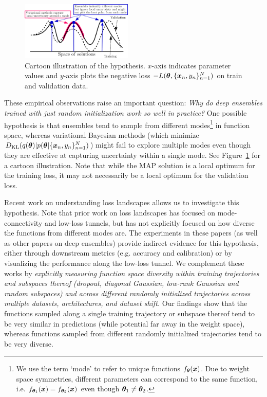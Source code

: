 \documentclass{article}
\newcommand{\data}{\{\vx_n, y_n\}_{n=1}^N}
\begin{document}
\begin{figure}
%
\vspace{-1em}
    \centering%
      \includegraphics[width=0.475\textwidth]{figures/big_idea_with_val.png}
\vspace{-0.5em}
    \caption{Cartoon illustration of the hypothesis. $x$-axis indicates parameter values and $y$-axis plots the negative loss $-L(\vtheta, \data)$ %
    on train and validation data. %
    }
    \vspace{-0.5em}
    \label{fig:ensemble-vs-bayes}%
%
%
\end{figure}
These empirical observations raise an important question:  %
   \emph{Why do %
deep ensembles trained with just random initialization 
work so well 
%
in practice?}  
%
One possible hypothesis is that ensembles tend to sample from different modes\footnote{We  use the term `mode' to refer to unique functions $f_{{\bm{\theta}}}({\bm{x}})$. Due to weight space symmetries, different parameters can correspond to the same function, i.e. $f_{{\bm{\theta}}_1}({\bm{x}}) = f_{{\bm{\theta}}_2}({\bm{x}})$ even though ${\bm{\theta}}_1\neq{\bm{\theta}}_2$. %
%
} in function space, whereas variational Bayesian methods (which minimize $D_{\mathrm{KL}}(q({\bm{\theta}})|p({\bm{\theta}}|\{{\bm{x}}_n,y_n\}_{n=1}^N)$) might fail to explore multiple modes even though they %
are effective at capturing uncertainty within a single mode. 
See Figure~\ref{fig:ensemble-vs-bayes} for a cartoon illustration. Note that while the MAP solution is a local optimum for the training loss,%
it may not necessarily be a local optimum for the validation loss. 


Recent work on understanding loss landscapes \citep{garipov2018loss,draxler2018essentially,fort2019large} allows us to investigate this hypothesis.  
Note that prior work on loss landscapes has focused on mode-connectivity and low-loss tunnels, but has not explicitly focused on how diverse the functions from different modes are. %
%
{The experiments in these papers (as well as other papers on deep ensembles) provide indirect evidence for this hypothesis, either through downstream metrics (e.g. accuracy and calibration) or by visualizing the performance along the low-loss tunnel.   
%
} We complement these works by \emph{explicitly measuring function space diversity within training trajectories and subspaces thereof (dropout, diagonal Gaussian, low-rank Gaussian and random  subspaces) and across different randomly initialized trajectories across multiple datasets, architectures, and dataset shift.}
%
%
Our findings show that the functions sampled along a single training trajectory or subspace thereof tend to be very similar in predictions (while potential far away in the weight space), whereas functions sampled from different randomly initialized trajectories tend to be very diverse. 
%
%
%
%
%
%
%
\end{document}
